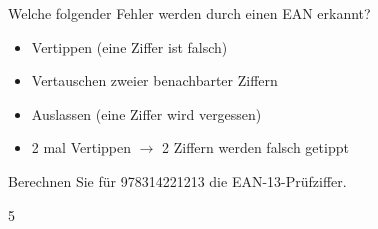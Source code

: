 \begin{myexercise}
	Welche folgender Fehler werden durch einen \gls{EAN} erkannt?
	\begin{itemize}
		\item Vertippen (eine Ziffer ist falsch)
		\item Vertauschen zweier benachbarter Ziffern
		\item Auslassen (eine Ziffer wird vergessen)
		\item 2 mal Vertippen \(\rightarrow\) 2 Ziffern werden falsch getippt
	\end{itemize}
\end{myexercise}

\begin{myexercise}
	Berechnen Sie für 978314221213 die \gls{EAN}-13-Prüfziffer.
	\begin{myanswer}
		5
	\end{myanswer}
\end{myexercise}

